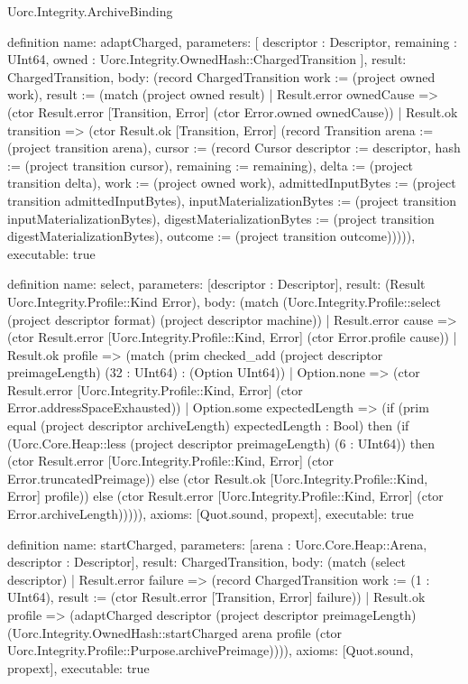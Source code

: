\begin{lexlean}{Uorc.Integrity.ArchiveBinding}
\begin{semanticmodule}
definition{
  name: adaptCharged,
  parameters: [
    descriptor : Descriptor,
    remaining : UInt64,
    owned : Uorc.Integrity.OwnedHash::ChargedTransition
  ],
  result: ChargedTransition,
  body: (record ChargedTransition {work := (project owned work), result := (match (project owned result)
    | Result.error ownedCause => (ctor Result.error [Transition, Error] (ctor Error.owned ownedCause))
    | Result.ok transition => (ctor Result.ok [Transition, Error] (record Transition {arena := (project transition arena), cursor := (record Cursor {descriptor := descriptor, hash := (project transition cursor), remaining := remaining}), delta := (project transition delta), work := (project owned work), admittedInputBytes := (project transition admittedInputBytes), inputMaterializationBytes := (project transition inputMaterializationBytes), digestMaterializationBytes := (project transition digestMaterializationBytes), outcome := (project transition outcome)})))}),
  executable: true
}

definition{
  name: select,
  parameters: [descriptor : Descriptor],
  result: (Result Uorc.Integrity.Profile::Kind Error),
  body: (match (Uorc.Integrity.Profile::select (project descriptor format) (project descriptor machine))
    | Result.error cause => (ctor Result.error [Uorc.Integrity.Profile::Kind, Error] (ctor Error.profile cause))
    | Result.ok profile => (match (prim checked_add (project descriptor preimageLength) (32 : UInt64) : (Option UInt64))
      | Option.none => (ctor Result.error [Uorc.Integrity.Profile::Kind, Error] (ctor Error.addressSpaceExhausted))
      | Option.some expectedLength => (if (prim equal (project descriptor archiveLength) expectedLength : Bool) then (if (Uorc.Core.Heap::less (project descriptor preimageLength) (6 : UInt64)) then (ctor Result.error [Uorc.Integrity.Profile::Kind, Error] (ctor Error.truncatedPreimage)) else (ctor Result.ok [Uorc.Integrity.Profile::Kind, Error] profile)) else (ctor Result.error [Uorc.Integrity.Profile::Kind, Error] (ctor Error.archiveLength))))),
  axioms: [Quot.sound, propext],
  executable: true
}

definition{
  name: startCharged,
  parameters: [arena : Uorc.Core.Heap::Arena, descriptor : Descriptor],
  result: ChargedTransition,
  body: (match (select descriptor)
    | Result.error failure => (record ChargedTransition {work := (1 : UInt64), result := (ctor Result.error [Transition, Error] failure)})
    | Result.ok profile => (adaptCharged descriptor (project descriptor preimageLength) (Uorc.Integrity.OwnedHash::startCharged arena profile (ctor Uorc.Integrity.Profile::Purpose.archivePreimage)))),
  axioms: [Quot.sound, propext],
  executable: true
}


\end{semanticmodule}
\end{lexlean}
